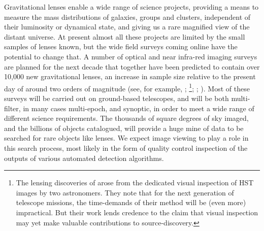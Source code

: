\documentclass[letterpaper, 11pt]{article}
\def\HST{HST\xspace}
\begin{document}
Gravitational lenses enable a wide range of science projects, providing a
means to measure the mass distributions of  galaxies, groups and clusters,
independent of their luminosity or dynamical state, and giving us a rare
magnified view of the distant universe. At present almost all these projects
are limited by the small samples of lenses known, but the wide field surveys
coming online have the potential to change that. A number of optical and near
infra-red imaging surveys are planned for the next decade that together have
been predicted to contain over 10,000 new gravitational lenses, an increase in
sample size relative to the present day of around two orders of magnitude
(see, for example, \citet{O+M10}; \citet{Paw++12}\footnote{The lensing discoveries of \citet{Paw++12} arose from the dedicated visual inspection of \HST images by two astronomers. They note that for the next generation of telescope missions, the time-demands of their method will be (even more) impractical. But their work lends credence to the claim that visual inspection may yet make valuable contributions to source-discovery.}; \citet[chapter 12]{LSST09}; \citet[chapter 1, page 8]{ERB10}). Most of these
surveys will be carried out on ground-based telescopes, and will be both
multi-filter, in many cases multi-epoch, and synoptic, in order to meet a wide
range of different science requirements. The thousands of square degrees of
sky imaged, and the billions of objects catalogued, will provide a huge mine
of data to be searched for rare objects like lenses. We expect image viewing
to play a role in this search process, most likely in the form of quality
control inspection of the outputs of various automated detection algorithms.
\end{document}
